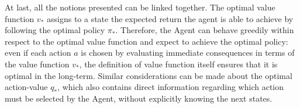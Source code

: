             At last, all the notions presented can be linked together. The optimal value function $v_{*}$ assigns to a state the expected return the agent is able to achieve by following the optimal policy $\pi_{*}$. Therefore, the Agent can behave greedily within respect to the optimal value function and expect to achieve the optimal policy: even if each action $a$ is chosen by evaluating immediate consequences in terms of the value function $v_{*}$, the definition of value function itself ensures that it is optimal in the long-term. Similar considerations can be made about the optimal action-value $q_{*}$, which also contains direct information regarding which action must be selected by the Agent, without explicitly knowing the next states. 
         

    
